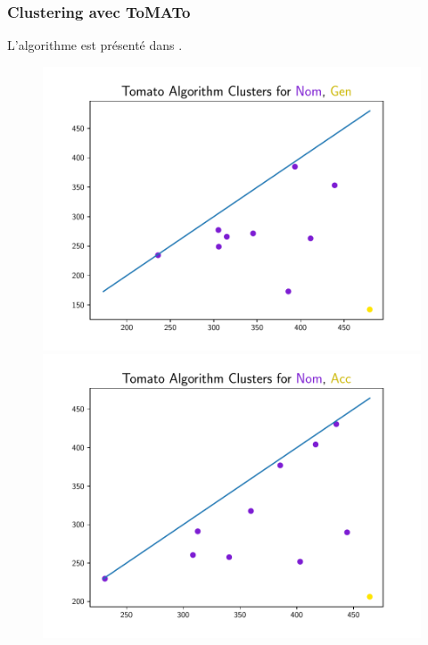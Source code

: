 \documentclass{cours}
\begin{document}
\subsubsection{Clustering avec ToMATo}
L'algorithme est présenté dans \cite{ToMATo}.
\begin{figure}[H]

\begin{center}
\begin{minipage}{.5\textwidth}
	\begin{center}
	\includegraphics[width=\linewidth]{Figures/Visualisations/tomato_Nom_Gen_Nouns}
	\end{center}
\end{minipage}
\end{center}

\begin{minipage}{.5\textwidth}
	\begin{center}
	\includegraphics[width=\linewidth]{Figures/Visualisations/tomato_Nom_Acc_Nouns}
	\end{center}
\end{minipage}


\end{figure}
\end{document}
